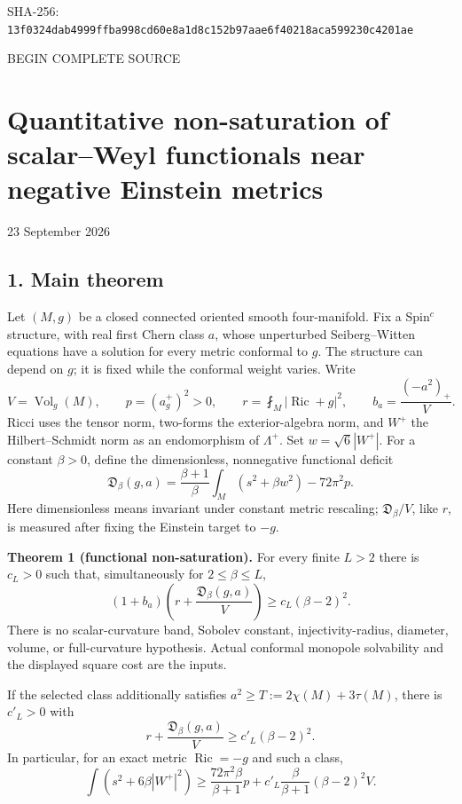 \documentclass[
  10pt,
]{article}
\begin{document}
SHA-256:
\nolinkurl{13f0324dab4999ffba998cd60e8a1d8c152b97aae6f40218aca599230c4201ae}

BEGIN COMPLETE SOURCE

\hypertarget{quantitative-non-saturation-of-scalarweyl-functionals-near-negative-einstein-metrics}{%
\section{Quantitative non-saturation of scalar--Weyl functionals near
negative Einstein
metrics}\label{quantitative-non-saturation-of-scalarweyl-functionals-near-negative-einstein-metrics}}

23 September 2026

\hypertarget{main-theorem}{%
\subsection{1. Main theorem}\label{main-theorem}}

Let \((M,g)\) be a closed connected oriented smooth four-manifold. Fix a
Spin\(^c\) structure, with real first Chern class \(a\), whose
unperturbed Seiberg--Witten equations have a solution for every metric
conformal to \(g\). The structure can depend on \(g\); it is fixed while
the conformal weight varies. Write \[
V=\operatorname{Vol}_g(M),\qquad p=(a_g^+)^2>0,\qquad
r=\fint_M|\operatorname{Ric}+g|^2,\qquad
b_a=\frac{(-a^2)_+}{V}.
\] Ricci uses the tensor norm, two-forms the exterior-algebra norm, and
\(W^+\) the Hilbert--Schmidt norm as an endomorphism of \(\Lambda^+\).
Set \(w=\sqrt6|W^+|\). For a constant \(\beta>0\), define the
dimensionless, nonnegative functional deficit \[
\mathfrak D_\beta(g,a)
=\frac{\beta+1}{\beta}\int_M(s^2+\beta w^2)
-72\pi^2p.
\tag{1}
\] Here dimensionless means invariant under constant metric rescaling;
\(\mathfrak D_\beta/V\), like \(r\), is measured after fixing the
Einstein target to \(-g\).

\textbf{Theorem 1 (functional non-saturation).} For every finite \(L>2\)
there is \(c_L>0\) such that, simultaneously for \(2\le\beta\le L\), \[
\boxed{
(1+b_a)\left(r+\frac{\mathfrak D_\beta(g,a)}V\right)
\ge c_L(\beta-2)^2.
}
\tag{2}
\] There is no scalar-curvature band, Sobolev constant,
injectivity-radius, diameter, volume, or full-curvature hypothesis.
Actual conformal monopole solvability and the displayed square cost are
the inputs.

If the selected class additionally satisfies
\(a^2\ge T:=2\chi(M)+3\tau(M)\), there is \(c'_L>0\) with \[
\boxed{
r+\frac{\mathfrak D_\beta(g,a)}V\ge c'_L(\beta-2)^2.
}
\tag{3}
\] In particular, for an exact metric \(\operatorname{Ric}=-g\) and such
a class, \[
\int(s^2+6\beta|W^+|^2)
\ge\frac{72\pi^2\beta}{\beta+1}p
+c'_L\frac{\beta}{\beta+1}(\beta-2)^2V.
\tag{4}
\]
\end{document}
